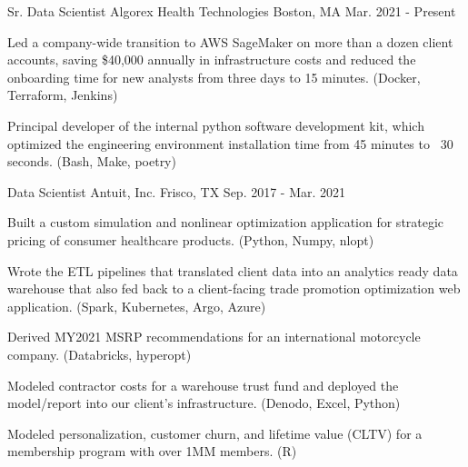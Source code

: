 

\begin{cventries}

  \cventry
    {Sr. Data Scientist} %
    {Algorex Health Technologies} %
    {Boston, MA} %
    {Mar. 2021 - Present} %
    {
      \begin{cvitems} %
      \item {Led a company-wide transition to AWS SageMaker on more
          than a dozen client accounts, saving \$40,000
          annually in infrastructure costs and reduced the onboarding time for
          new analysts from three days to 15 minutes. (Docker, Terraform, Jenkins)}
      \item {Principal developer of the internal python software
          development kit, which optimized the engineering environment
          installation time from 45 minutes to ~30 seconds. (Bash, Make, poetry)}
      \end{cvitems}
    }

  \cventry
    {Data Scientist} %
    {Antuit, Inc.} %
    {Frisco, TX} %
    {Sep. 2017 - Mar. 2021} %
    {
      \begin{cvitems} %
      \item {Built a custom simulation and nonlinear optimization
          application for strategic pricing of consumer healthcare
          products. (Python, Numpy, nlopt)}
      \item {Wrote the ETL pipelines that translated client data into
          an analytics ready data warehouse that also fed back to a
          client-facing trade promotion optimization web
          application. (Spark, Kubernetes, Argo, Azure) }
      \item {Derived MY2021 MSRP recommendations for an
          international motorcycle company. (Databricks, hyperopt)}
      \item {Modeled contractor costs for a warehouse trust fund and
          deployed the model/report into our client's
          infrastructure. (Denodo, Excel, Python)}
      \item {Modeled personalization, customer churn, and lifetime value
          (CLTV) for a membership program with over 1MM members. (R)}
      \end{cvitems}
    }

\end{cventries}
